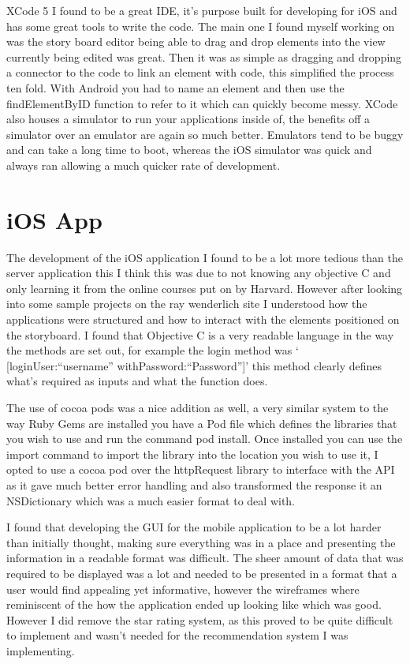 	XCode 5 I found to be a great IDE, it's purpose built for developing for iOS and has some great tools to write the code. The main one I found myself working on was the story board editor being able to drag and drop elements into the view currently being edited was great. Then it was as simple as dragging and dropping a connector to the code to link an element with code, this simplified the process ten fold. With Android you had to name an element and then use the findElementByID function to refer to it which can quickly become messy. XCode also houses a simulator to run your applications inside of, the benefits off a simulator over an emulator are again so much better. Emulators tend to be buggy and can take a long time to boot, whereas the iOS simulator was quick and always ran allowing a much quicker rate of development. 

\section{iOS App}
	The development of the iOS application I found to be a lot more tedious than the server application this I think this was due to not knowing any objective C and only learning it from the online courses put on by Harvard. However after looking into some sample projects on the ray wenderlich site I understood how the applications were structured and how to interact with the elements positioned on the storyboard. I found that Objective C is a very readable language in the way the methods are set out, for example the login method was ` [loginUser:\@``username'' withPassword:\@``Password'']' this method clearly defines what's required as inputs and what the function does. 

	The use of cocoa pods was a nice addition as well, a very similar system to the way Ruby Gems are installed you have a Pod file which defines the libraries that you wish to use and run the command pod install. Once installed you can use the import command to import the library into the location you wish to use it, I opted to use a cocoa pod over the httpRequest library to interface with the API as it gave much better error handling and also transformed the response it an NSDictionary which was a much easier format to deal with.

	I found that developing the GUI for the mobile application to be a lot harder than initially thought, making sure everything was in a place  and presenting the information in a readable format was difficult. The sheer amount of data that was required to be displayed was a lot and needed to be presented in a format that a user would find appealing yet informative, however the wireframes where reminiscent of the how the application ended up looking like which was good. However I did remove the star rating system, as this proved to be quite difficult to implement and wasn't needed for the recommendation system I was implementing.


